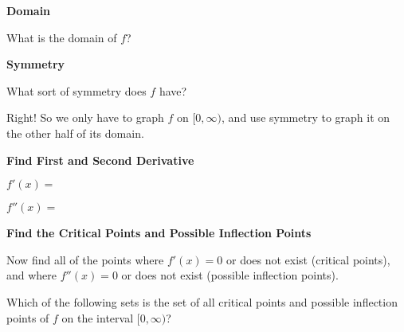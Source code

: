 \documentclass{ximera}
\begin{document}
\begin{question}

\textbf{Domain}

\begin{solution}
What is the domain of $f$?
 
    \begin{multipleChoice}
    \end{multipleChoice}
    
\end{solution}    

\textbf{Symmetry}

\begin{solution}
   What sort of symmetry does $f$ have?
   
    \begin{multipleChoice}
    \end{multipleChoice}

\end{solution}    

    Right!  So we only have to graph $f$ on $[0,\infty)$, and use symmetry to graph it on the other half of its domain.
    
 \textbf{Find First and Second Derivative}
 
 \begin{solution}
 	$f'(x)=$
 \end{solution}
 
 \begin{solution}
 	$f''(x)=$
 \end{solution}
 
 \textbf{Find the Critical Points and Possible Inflection Points}
 
 \begin{solution}
	Now find all of the points where $f'(x)=0$ or does not exist (critical points), and where $f''(x)=0$ or does not exist (possible inflection points).
	
	Which of the following sets is the set of all critical points and possible inflection points of $f$ on the interval $[0,\infty)$?
	
	 \begin{multipleChoice}
    \end{multipleChoice}


\end{solution}
\end{question}
\end{document}
